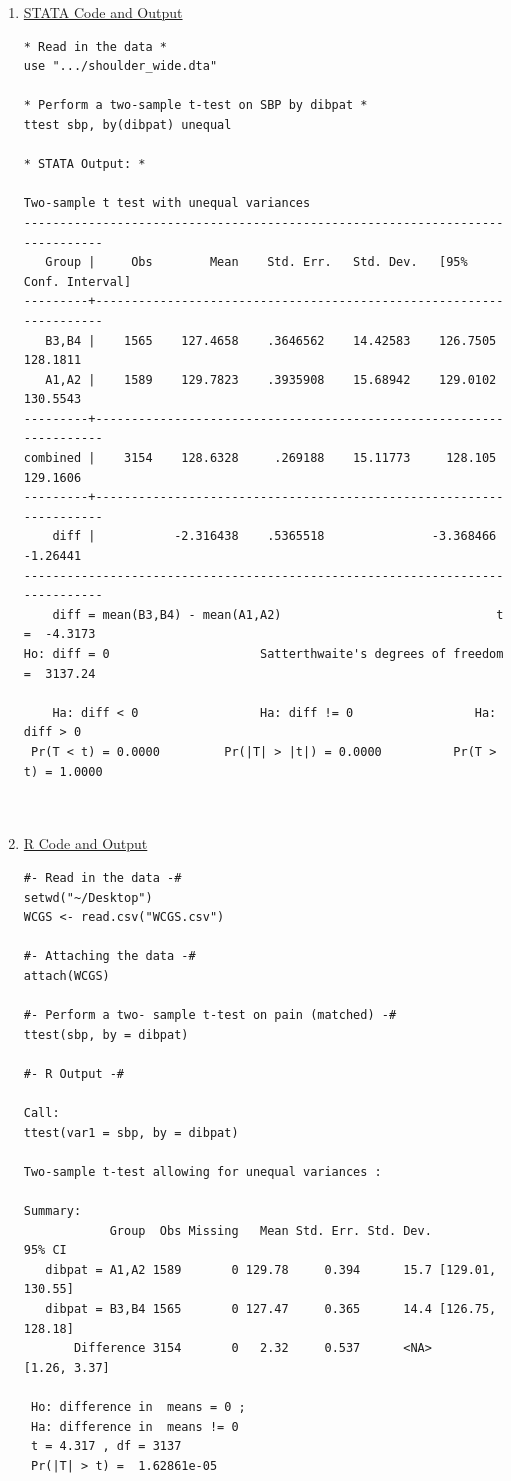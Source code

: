 \documentclass[11pt,letterpaper,fleqn]{report}
\begin{document}
\begin{enumerate}[]
\item \underline{STATA Code and Output}
{\scriptsize
\begin{verbatim}
* Read in the data *
use ".../shoulder_wide.dta"

* Perform a two-sample t-test on SBP by dibpat *
ttest sbp, by(dibpat) unequal

* STATA Output: *

Two-sample t test with unequal variances
------------------------------------------------------------------------------
   Group |     Obs        Mean    Std. Err.   Std. Dev.   [95% Conf. Interval]
---------+--------------------------------------------------------------------
   B3,B4 |    1565    127.4658    .3646562    14.42583    126.7505    128.1811
   A1,A2 |    1589    129.7823    .3935908    15.68942    129.0102    130.5543
---------+--------------------------------------------------------------------
combined |    3154    128.6328     .269188    15.11773     128.105    129.1606
---------+--------------------------------------------------------------------
    diff |           -2.316438    .5365518               -3.368466    -1.26441
------------------------------------------------------------------------------
    diff = mean(B3,B4) - mean(A1,A2)                              t =  -4.3173
Ho: diff = 0                     Satterthwaite's degrees of freedom =  3137.24

    Ha: diff < 0                 Ha: diff != 0                 Ha: diff > 0
 Pr(T < t) = 0.0000         Pr(|T| > |t|) = 0.0000          Pr(T > t) = 1.0000



\end{verbatim}}
\item \underline{R Code and Output}
{\scriptsize
\begin{verbatim}
#- Read in the data -#
setwd("~/Desktop")
WCGS <- read.csv("WCGS.csv")

#- Attaching the data -#
attach(WCGS)

#- Perform a two- sample t-test on pain (matched) -#
ttest(sbp, by = dibpat)

#- R Output -#

Call:
ttest(var1 = sbp, by = dibpat)

Two-sample t-test allowing for unequal variances :
 
Summary:
            Group  Obs Missing   Mean Std. Err. Std. Dev.           95% CI
   dibpat = A1,A2 1589       0 129.78     0.394      15.7 [129.01, 130.55]
   dibpat = B3,B4 1565       0 127.47     0.365      14.4 [126.75, 128.18]
       Difference 3154       0   2.32     0.537      <NA>     [1.26, 3.37]

 Ho: difference in  means = 0 ; 
 Ha: difference in  means != 0 
 t = 4.317 , df = 3137 
 Pr(|T| > t) =  1.62861e-05 

\end{verbatim}}
\end{enumerate}
\end{document}
